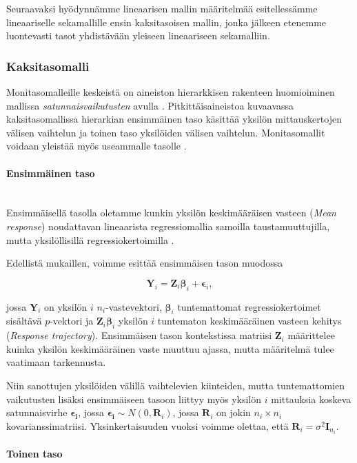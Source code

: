 \documentclass[finnish]{docopts}
\begin{document}
Seuraavaksi hyödynnämme lineaarisen mallin määritelmää esitellessämme lineaariselle sekamallille ensin kaksitasoisen mallin, jonka jälkeen etenemme luontevasti tasot yhdistävään \cite{laird82} yleiseen lineaariseen sekamalliin.

\subsubsection{Kaksitasomalli}
\label{ssb:kaksitaso}

Monitasomalleille keskeistä on aineiston hierarkkisen rakenteen huomioiminen mallissa \textit{satunnaisvaikutusten} avulla \citep{talbott06}. Pitkittäisaineistoa kuvaavassa kaksitasomallissa hierarkian ensimmäinen taso käsittää yksilön mittauskertojen välisen vaihtelun ja toinen taso yksilöiden välisen vaihtelun. Monitasomallit voidaan yleistää myös useammalle tasolle \citep{goldstein11, burzykowski13}.

\paragraph{Ensimmäinen taso}\mbox{}\\

Ensimmäisellä tasolla oletamme kunkin yksilön keskimääräisen vasteen (\textit{Mean response}) noudattavan lineaarista regressiomallia samoilla taustamuuttujilla, mutta yksilöllisillä regressiokertoimilla \citep{fitzmaurice11}. 

Edellistä mukaillen, voimme esittää ensimmäisen tason muodossa

$$
\bm{Y}_i = \bm{Z}_i \bm{\beta}_i + \bm{\epsilon}_i,
$$

jossa $\bm{Y}_i$ on yksilön $i$ $n_i$-vastevektori, $\bm{\beta}_i$ tuntemattomat regressiokertoimet sisältävä $p$-vektori ja $\bm{Z}_i \bm{\beta}_i$ yksilön $i$ tuntematon keskimääräinen vasteen kehitys (\textit{Response trajectory}). Ensimmäisen tason kontekstissa matriisi $\bm{Z}_i$ määrittelee kuinka yksilön keskimääräinen vaste muuttuu ajassa, mutta määritelmä tulee vaatimaan tarkennusta.

Niin sanottujen yksilöiden välillä vaihtelevien kiinteiden, mutta tuntemattomien vaikutusten lisäksi ensimmäiseen tasoon liittyy myös yksilön $i$ mittauksia koskeva satunnaisvirhe $\bm{\epsilon_i}$, jossa $\bm{\epsilon_i} \sim N(0,\bm{R}_i)$, jossa $\bm{R}_i$ on jokin $n_i \times n_i$ kovarianssimatriisi. Yksinkertaisuuden vuoksi voimme olettaa, että $\bm{R}_i = \sigma^2\bm{I}_{n_i}.$

\paragraph{Toinen taso}\mbox{}\\
\end{document}
